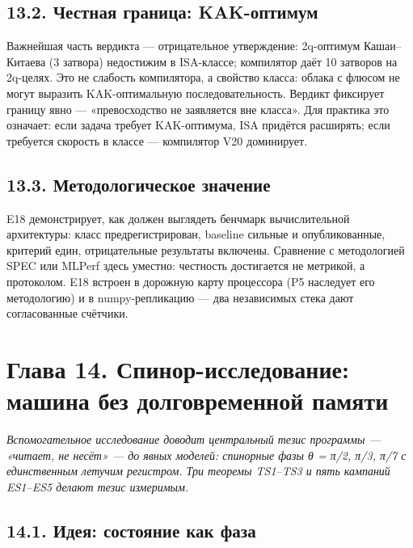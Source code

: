 \documentclass[11pt,a4paper]{article}
\begin{document}
\begin{center}\end{center}

\subsection{13.2. Честная граница: KAK-оптимум}

Важнейшая часть вердикта — отрицательное утверждение: 2q-оптимум Кашаи–Китаева (3 затвора) недостижим в ISA-классе; компилятор даёт 10 затворов на 2q-целях. Это не слабость компилятора, а свойство класса: облака с флюсом не могут выразить KAK-оптимальную последовательность. Вердикт фиксирует границу явно — «превосходство не заявляется вне класса». Для практика это означает: если задача требует KAK-оптимума, ISA придётся расширять; если требуется скорость в классе — компилятор V20 доминирует.

\subsection{13.3. Методологическое значение}

E18 демонстрирует, как должен выглядеть бенчмарк вычислительной архитектуры: класс предрегистрирован, baseline сильные и опубликованные, критерий един, отрицательные результаты включены. Сравнение с методологией SPEC или MLPerf здесь уместно: честность достигается не метрикой, а протоколом. E18 встроен в дорожную карту процессора (P5 наследует его методологию) и в numpy-репликацию — два независимых стека дают согласованные счётчики.

\section{Глава 14. Спинор-исследование: машина без долговременной памяти}

\noindent\textit{\color{copper}Вспомогательное исследование доводит центральный тезис программы — «читает, не несёт» — до явных моделей: спинорные фазы θ = π/2, π/3, π/7 с единственным летучим регистром. Три теоремы TS1–TS3 и пять кампаний ES1–ES5 делают тезис измеримым.}

\subsection{14.1. Идея: состояние как фаза}
\end{document}
